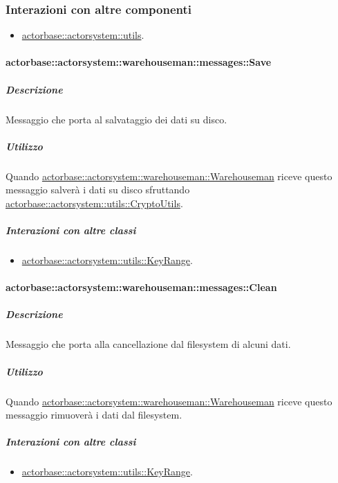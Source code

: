 \documentclass{scalatekids-article}
\begin{document}
\subsubsection{Interazioni con altre componenti}
\begin{itemize}
\item \hyperref[sec:actorbase::actorsystem::utils]{actorbase::actorsystem::utils}.
\end{itemize}

\paragraph{actorbase::actorsystem::warehouseman::messages::Save}
\label{sec:actorbase::actorsystem::warehouseman::messages::Save}

\subparagraph{Descrizione}

Messaggio che porta al salvataggio dei dati su disco.

\subparagraph{Utilizzo}

Quando \hyperref[sec:actorbase::actorsystem::warehouseman::Warehouseman]{actorbase::actorsystem::warehouseman::Warehouseman}
riceve questo messaggio salverà i dati su disco sfruttando
\hyperref[sec:actorbase::actorsystem::serialization::SerializationContext]{actorbase::actorsystem::utils::CryptoUtils}.

\subparagraph{Interazioni con altre classi}
\begin{itemize}
\item \hyperref[sec:actorbase::actorsystem::utils::KeyRange]{actorbase::actorsystem::utils::KeyRange}.
\end{itemize}

\paragraph{actorbase::actorsystem::warehouseman::messages::Clean}
\label{sec:actorbase::actorsystem::warehouseman::messages::Clean}

\subparagraph{Descrizione}

Messaggio che porta alla cancellazione dal filesystem di alcuni dati.

\subparagraph{Utilizzo}

Quando \hyperref[sec:actorbase::actorsystem::warehouseman::Warehouseman]{actorbase::actorsystem::warehouseman::Warehouseman}
riceve questo messaggio rimuoverà i dati dal filesystem.

\subparagraph{Interazioni con altre classi}
\begin{itemize}
\item \hyperref[sec:actorbase::actorsystem::utils::KeyRange]{actorbase::actorsystem::utils::KeyRange}.
\end{itemize}
\end{document}
